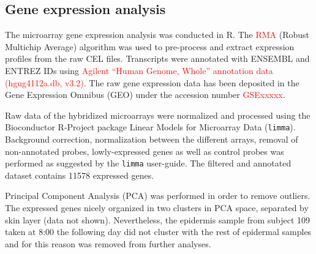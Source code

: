 \subsection*{Gene expression analysis}
The microarray gene expression analysis was conducted in R. The \textcolor{red}{RMA} (Robust Multichip Average) algorithm was used to pre-process and extract expression profiles from the raw CEL files. Transcripts were annotated with ENSEMBL and ENTREZ IDs using \textcolor{red}{Agilent ``Human Genome, Whole'' annotation data (hgug4112a.db, v3.2)}. The raw gene expression data has been deposited in the Gene Expression Omnibus (GEO) under the accession number \textcolor{red}{GSExxxxx}. 

Raw data of the hybridized microarrays were normalized and processed using the Bioconductor R-Project package Linear Models for Microarray Data (\texttt{limma}). Background correction, normalization between the different arrays, removal of non-annotated probes, lowly-expressed genes as well as control probes was performed as suggested by the \texttt{limma} user-guide. The filtered and annotated dataset contains 11578 expressed genes. %

Principal Component Analysis (PCA) was performed in order to remove outliers. The expressed genes nicely organized in two clusters in PCA space, separated by skin layer (data not shown). Nevertheless, the epidermis sample from subject 109 taken at 8:00 the following day did not cluster with the rest of epidermal samples and for this reason was removed from further analyses. 

